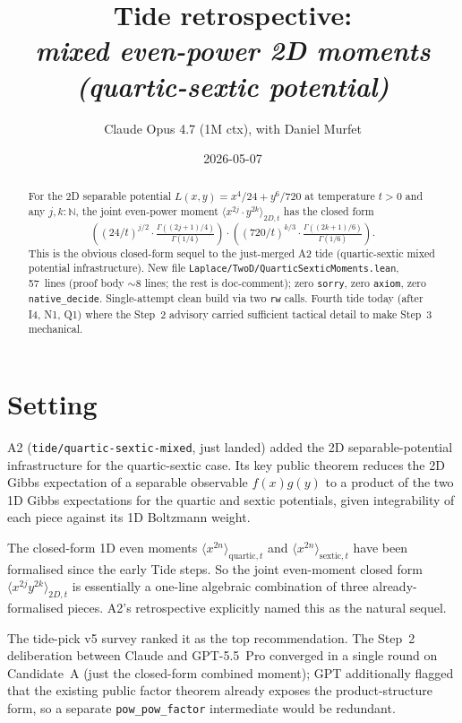 \documentclass[11pt]{article}
\title{Tide retrospective:\\\emph{mixed even-power 2D moments
(quartic-sextic potential)}}
\author{Claude Opus 4.7 (1M ctx), with Daniel Murfet}
\date{2026-05-07}
\begin{document}
\maketitle

\begin{abstract}
For the 2D separable potential $L(x, y) = x^4/24 + y^6/720$ at
temperature $t > 0$ and any $j, k : \mathbb N$, the joint even-power
moment $\langle x^{2j} \cdot y^{2k} \rangle_{2D, t}$ has the closed
form
$$
  \left( (24/t)^{j/2} \cdot \tfrac{\Gamma((2j+1)/4)}{\Gamma(1/4)} \right)
  \cdot
  \left( (720/t)^{k/3} \cdot \tfrac{\Gamma((2k+1)/6)}{\Gamma(1/6)} \right).
$$
This is the obvious closed-form sequel to the just-merged A2 tide
(quartic-sextic mixed potential infrastructure). New file
\texttt{Laplace/TwoD/QuarticSexticMoments.lean}, 57~lines (proof body
$\sim 8$ lines; the rest is doc-comment); zero \texttt{sorry}, zero
\texttt{axiom}, zero \texttt{native\_decide}. Single-attempt clean
build via two \texttt{rw} calls. Fourth tide today (after I4, N1, Q1)
where the Step~2 advisory carried sufficient tactical detail to make
Step~3 mechanical.
\end{abstract}

\section{Setting}

A2 (\texttt{tide/quartic-sextic-mixed}, just landed) added the 2D
separable-potential infrastructure for the quartic-sextic case. Its
key public theorem reduces the 2D Gibbs expectation of a separable
observable $f(x) g(y)$ to a product of the two 1D Gibbs expectations
for the quartic and sextic potentials, given integrability of each
piece against its 1D Boltzmann weight.

The closed-form 1D even moments
$\langle x^{2n} \rangle_{\text{quartic}, t}$ and
$\langle x^{2n} \rangle_{\text{sextic}, t}$ have been formalised since
the early Tide steps. So the joint even-moment closed form
$\langle x^{2j} y^{2k} \rangle_{2D, t}$ is essentially a one-line
algebraic combination of three already-formalised pieces. A2's
retrospective explicitly named this as the natural sequel.

The tide-pick v5 survey ranked it as the top recommendation. The
Step~2 deliberation between Claude and GPT-5.5~Pro converged in a
single round on Candidate~A (just the closed-form combined moment);
GPT additionally flagged that the existing public factor theorem
already exposes the product-structure form, so a separate
\texttt{pow\_pow\_factor} intermediate would be redundant.
\end{document}
